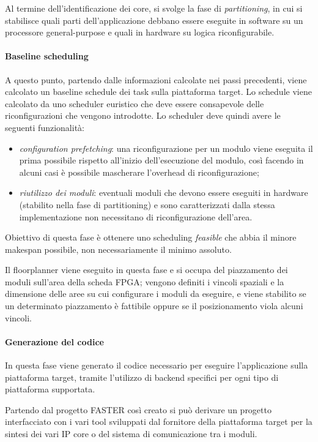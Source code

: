 Al termine dell'identificazione dei core, si svolge la fase di 
\emph{partitioning}, in cui si stabilisce quali parti dell'applicazione debbano 
essere eseguite in software su un processore general-purpose e quali in 
hardware su logica riconfigurabile.

\paragraph{Baseline scheduling}
A questo punto, partendo dalle informazioni calcolate nei passi precedenti, 
viene calcolato un baseline schedule dei task sulla piattaforma target. Lo 
schedule viene calcolato da uno scheduler euristico che deve essere consapevole
delle riconfigurazioni che vengono introdotte. Lo scheduler deve quindi 
avere le seguenti funzionalità:
\begin{itemize}
 \item \emph{configuration prefetching}: una riconfigurazione per un 
modulo viene eseguita il prima possibile rispetto all'inizio dell'esecuzione 
del modulo, così facendo in alcuni casi è possibile mascherare l'overhead di 
riconfigurazione;
 \item \emph{riutilizzo dei moduli}: eventuali moduli che devono 
essere eseguiti in hardware (stabilito nella fase di partitioning) e sono 
caratterizzati dalla stessa implementazione non necessitano di riconfigurazione 
dell'area.
\end{itemize}
Obiettivo di questa fase è ottenere uno scheduling \emph{feasible} che abbia il 
minore makespan possibile, non necessariamente il minimo assoluto.

Il floorplanner viene eseguito in questa fase e si occupa del piazzamento dei 
moduli sull'area della scheda \ac{FPGA}; vengono definiti i vincoli spaziali e 
la dimensione delle aree su cui configurare i moduli da eseguire, e viene 
stabilito se un determinato piazzamento è fattibile oppure se il posizionamento
viola alcuni vincoli.

\paragraph{Generazione del codice} %
In questa fase viene generato il codice necessario per eseguire l'applicazione 
sulla piattaforma target, tramite l'utilizzo di backend specifici per ogni tipo 
di piattaforma supportata.

Partendo dal progetto \ac{FASTER} così creato si può derivare un progetto 
interfacciato con i vari tool sviluppati dal fornitore della piattaforma target 
per la sintesi dei vari IP core o del sistema di comunicazione tra i moduli.


